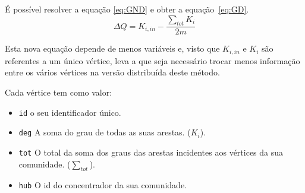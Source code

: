 É possível resolver a equação \ref{eq:GND} e obter a equação~\ref{eq:GD}.
\begin{equation}
	\Delta Q  =  K_{i,in} - \frac{\sum_{tot} K_i}{2m}
\label{eq:GD}
\end{equation}


Esta nova equação depende de menos variáveis e, visto que $K_{i,in}$ e $K_i$ são referentes a um único vértice, leva a que seja necessário trocar menos informação entre os vários vértices na versão distribuída deste método.

Cada vértice tem como valor:
\begin{itemize}
	\item \verb|id| o seu identificador único.
	\item \verb|deg| A soma do grau de todas as suas arestas. ($K_i$).
	\item \verb|tot| O total da soma dos graus das arestas incidentes aos vértices da sua comunidade. ($\sum_{tot}$).
	\item \verb|hub| O id do concentrador da sua comunidade.
\end{itemize}

